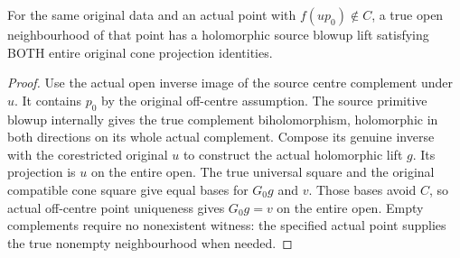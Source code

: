 \begin{theorem}
\label{hir:submersion-blowup-local-cone-original-off}
\leanok
{}
For the same original data and an actual point with $f(u p_0)\notin C$, a true
open neighbourhood of that point has a holomorphic source blowup lift
satisfying BOTH entire original cone projection identities.
\end{theorem}
\begin{proof}
Use the actual open inverse image of the source centre complement under $u$.
It contains $p_0$ by the original off-centre assumption. The source primitive
blowup internally gives the true complement biholomorphism, holomorphic in
both directions on its whole actual complement. Compose its genuine inverse
with the corestricted original $u$ to construct the actual holomorphic lift
$g$. Its projection is $u$ on the entire open. The true universal square and
the original compatible cone square give equal bases for $G_0g$ and $v$.
Those bases avoid $C$, so actual off-centre point uniqueness gives $G_0g=v$
on the entire open. Empty complements require no nonexistent witness: the
specified actual point supplies the true nonempty neighbourhood when needed.
\end{proof}

